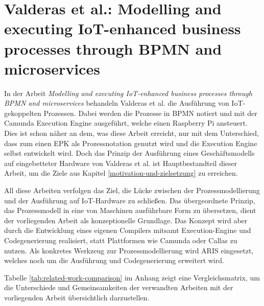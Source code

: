 \section[Valderas et al.: Modelling and executing IoT-enhanced business processes]{Valderas et al.: Modelling and executing IoT-enhanced business processes through BPMN and microservices}

\noindent In der Arbeit \textit{Modelling and executing IoT-enhanced business processes through BPMN and microservices} behandeln Valderas et al. die Ausführung von 
IoT-gekoppelten Prozessen. Dabei werden die Prozesse in BPMN notiert und mit der Camunda Execution Engine ausgeführt, welche einen Raspberry Pi ansteuert. \cite{valderas_modelling_2022} Dies ist schon näher an dem, was diese Arbeit erreicht, nur mit dem Unterschied, dass zum einen EPK als Prozessnotation genutzt wird und die Execution Engine selbst entwickelt wird. Doch das Prinzip der Ausführung eines Geschäftsmodells auf eingebetteter Hardware von Valderas et al. ist Hauptbestandteil dieser Arbeit, um die Ziele aus Kapitel \ref{motivation-und-zielsetzung} zu erreichen.

\noindent All diese Arbeiten verfolgen das Ziel, die Lücke zwischen der Prozessmodellierung und der Ausführung auf IoT-Hardware zu schließen. Das übergeordnete Prinzip, das Prozessmodell in eine von Maschinen ausführbare Form zu übersetzen, dient der vorliegenden Arbeit als konzeptionelle Grundlage. Das Konzept wird aber durch die Entwicklung eines eigenen Compilers mitsamt Execution-Engine und Codegenerierung realisiert, statt Plattformen wie Camunda oder Callas zu nutzen. Als konkretes Werkzeug zur Prozessmodellierung wird ARIS eingesetzt, welches noch um die Ausführung und Codegenerierung erweitert wird.

\noindent Tabelle \ref{tab:related-work-comparison} im Anhang zeigt eine Vergleichsmatrix, um die Unterschiede und Gemeinsamkeiten der verwandten Arbeiten mit der vorliegenden Arbeit übersichtlich darzustellen.
